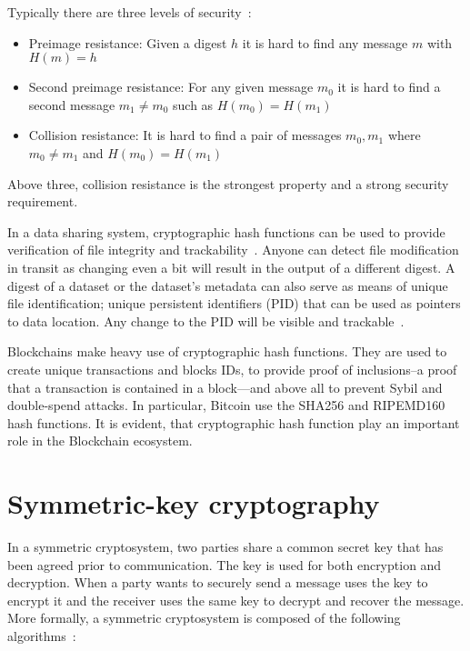Typically there are three levels of security~\cite{Katz:2014:IMC:2700550}:

\begin{itemize}
  \item Preimage resistance: Given a digest $h$ it is hard to find any message $m$ with $H(m) = h$
  \item Second preimage resistance: For any given message $m_0$ it is hard to find a second message $m_1 \neq m_0$ such as $H(m_0) = H(m_1)$
  \item Collision resistance: It is hard to find a pair of messages $m_0, m_1$ where $m_0 \neq m_1$ and $H(m_0) = H(m_1)$
\end{itemize}

Above three, collision resistance is the strongest property and a strong security requirement.

In a data sharing system, cryptographic hash functions can be used to provide verification of file integrity and trackability~\cite{10.1109/SPW.2015.27, Azaria2016}. Anyone can detect file modification in transit as changing even a bit will result in the output of a different digest. A digest of a dataset or the dataset's metadata can also serve as means of unique file identification; unique persistent identifiers (PID) that can be used as pointers to data location. Any change to the PID will be visible and trackable~\cite{dist_pid}.

Blockchains make heavy use of cryptographic hash functions. They are used to create unique transactions and blocks IDs, to provide proof of inclusions--a proof that a transaction is contained in a block---and above all to prevent Sybil and double-spend attacks. In particular, Bitcoin use the SHA256 and RIPEMD160 hash functions. It is evident, that cryptographic hash function play an important role in the Blockchain ecosystem.

\section{Symmetric-key cryptography}
\label{preliminaries:sym}

In a symmetric cryptosystem, two parties share a common secret key that has been agreed prior to communication. The key is used for both encryption and decryption. When a party wants to securely send a message uses the key to encrypt it and the receiver uses the same key to decrypt and recover the message. More formally, a symmetric cryptosystem is composed of the following algorithms~\cite{Katz:2014:IMC:2700550, kiagias:crypto}:

